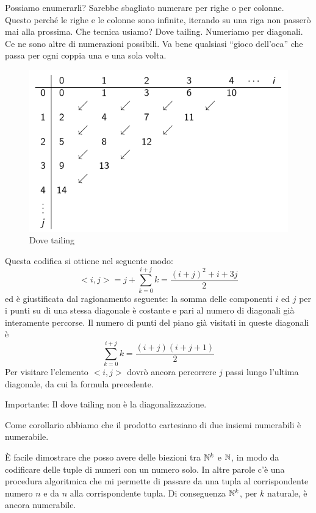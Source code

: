 Possiamo enumerarli? Sarebbe sbagliato numerare per righe o per colonne. Questo perché le righe e
le colonne sono infinite, iterando su una riga non passerò mai alla prossima. Che tecnica usiamo?
Dove tailing. Numeriamo per diagonali. Ce ne sono altre di numerazioni possibili. Va bene qualsiasi
``gioco dell'oca'' che passa per ogni coppia una e una sola volta.

\begin{figure}[h]
    \centering
    \includegraphics[scale=0.5]{img/DoveTailing.jpg}
    \caption{Dove tailing}
\end{figure}

Questa codifica si ottiene nel seguente modo:
\begin{equation*}
    <i,j> = j + \sum_{k=0}^{i+j}k = \frac{(i+j)^{2}+i+3j}{2}
\end{equation*}
ed è giustificata dal ragionamento seguente: la somma delle componenti $i$ ed $j$ per i punti su di una
stessa diagonale è costante e pari al numero di diagonali già interamente percorse. Il numero di
punti del piano già visitati in queste diagonali è
\begin{equation*}
    \sum_{k=0}^{i+j}k = \frac{(i+j)(i+j+1)}{2}
\end{equation*}
Per visitare l'elemento $<i,j>$ dovrò ancora percorrere $j$ passi lungo l'ultima diagonale, da cui
la formula precedente.

Importante: Il dove tailing non è la diagonalizzazione.

Come corollario abbiamo che il prodotto cartesiano di due insiemi numerabili è numerabile.

È facile dimostrare che posso avere delle biezioni tra $\mathbb{N}^{k}$ e $\mathbb{N}$, in modo da codificare
delle tuple di numeri con un numero solo. In altre parole c'è una procedura algoritmica che mi
permette di passare da una tupla al corrispondente numero $n$ e da $n$ alla corrispondente tupla. Di
conseguenza $\mathbb{N}^{k}$, per $k$ naturale, è ancora numerabile.

